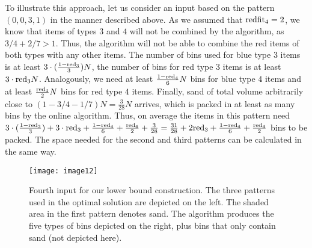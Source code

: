 To illustrate this approach, let us consider an input based on the pattern $(0,0,3,1)$ in the manner described above. As we assumed that $\mathrm{redfit}_4=2$, we know that items of types $3$ and $4$ will not be 
combined by the algorithm, as $3/4+2/7>1$. Thus, the algorithm will not be able to combine the red items 
of both types with any other items. 
The number of bins used for blue type $3$ items is at least $3\cdot(\frac{1-\mathrm{red}_3}{3})N$, 
the number of bins for red type $3$ items is at least $3\cdot\mathrm{red}_3N$. 
Analogously, we need at least $\frac{1-\mathrm{red}_4}{6}N$ bins for blue type $4$ items and at least 
$\frac{\mathrm{red}_4}{2}N$ bins for red type $4$ items. Finally, sand of total volume arbitrarily close to $(1-3/4-1/7)N=\frac{3}{28}N$ 
arrives, which is packed in at least as many bins by the online algorithm. 
Thus, on average the items in this pattern need $3\cdot(\frac{1-\mathrm{red}_3}{3}) + 3\cdot\mathrm{red}_3 + \frac{1-\mathrm{red}_4}{6} + \frac{\mathrm{red}_4}{2} + \frac{3}{28} 
= \frac{31}{28} + 2\mathrm{red}_3+\frac{1-\mathrm{red}_4}{6}+\frac{\mathrm{red}_4}{2}$ bins to be packed.
The space needed for the second and third patterns can be calculated in the same way. 


\begin{figure}[h]
	\texttt{[image: image12]}
	\caption{Fourth input for our lower bound construction. The three patterns used in the optimal solution are depicted on the left. The shaded area in the first pattern denotes sand. The algorithm produces the five types of bins depicted on the right, plus bins that only contain sand (not depicted here).}
	\label{fig:lower-bound}
\end{figure}

